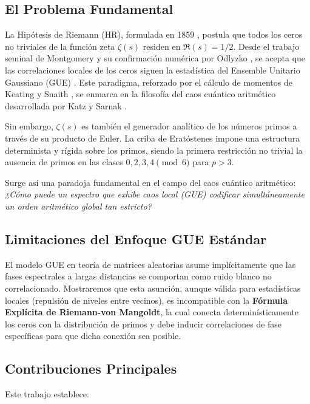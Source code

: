 \documentclass[12pt, a4paper]{article}
\theoremstyle{plain}
\theoremstyle{definition}
\begin{document}
\subsection{El Problema Fundamental}

La Hipótesis de Riemann (HR), formulada en 1859 \cite{riemann1859}, postula que todos los ceros no triviales de la función zeta $\zeta(s)$ residen en $\Re(s)=1/2$. Desde el trabajo seminal de Montgomery \cite{montgomery1973} y su confirmación numérica por Odlyzko \cite{odlyzko2001}, se acepta que las correlaciones locales de los ceros siguen la estadística del Ensemble Unitario Gaussiano (GUE) \cite{montgomery1973, odlyzko2001, berry1999}. Este paradigma, reforzado por el cálculo de momentos de Keating y Snaith \cite{keatingsnaith2000}, se enmarca en la filosofía del caos cuántico aritmético desarrollada por Katz y Sarnak \cite{katzsarnak1999, sarnak1999}.

Sin embargo, $\zeta(s)$ es también el generador analítico de los números primos a través de su producto de Euler. La criba de Eratóstenes impone una estructura determinista y rígida sobre los primos, siendo la primera restricción no trivial la ausencia de primos en las clases $0,2,3,4 \pmod{6}$ para $p>3$.

Surge así una paradoja fundamental en el campo del caos cuántico aritmético: \textit{¿Cómo puede un espectro que exhibe caos local (GUE) codificar simultáneamente un orden aritmético global tan estricto?}

\subsection{Limitaciones del Enfoque GUE Estándar}

El modelo GUE en teoría de matrices aleatorias asume implícitamente que las fases espectrales a largas distancias se comportan como ruido blanco no correlacionado. Mostraremos que esta asunción, aunque válida para estadísticas locales (repulsión de niveles entre vecinos), es incompatible con la \textbf{Fórmula Explícita de Riemann-von Mangoldt}, la cual conecta determinísticamente los ceros con la distribución de primos y debe inducir correlaciones de fase específicas para que dicha conexión sea posible.

\subsection{Contribuciones Principales}

Este trabajo establece:
\end{document}
